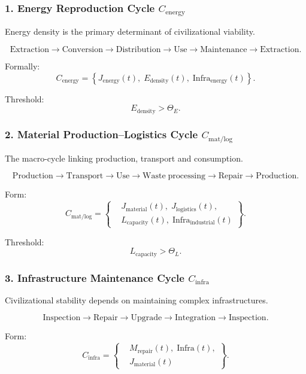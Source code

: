 \subsubsection{1. Energy Reproduction Cycle $C_{\mathrm{energy}}$}

Energy density is the primary determinant of civilizational viability.

\[
  \mathrm{Extraction}
  \to
  \mathrm{Conversion}
  \to
  \mathrm{Distribution}
  \to
  \mathrm{Use}
  \to
  \mathrm{Maintenance}
  \to
  \mathrm{Extraction}.
\]

Formally:
\[
  C_{\mathrm{energy}} =
  \left\{
    J_{\mathrm{energy}}(t),\;
    E_{\mathrm{density}}(t),\;
    \mathrm{Infra}_{\mathrm{energy}}(t)
  \right\}.
\]

Threshold:
\[
  E_{\mathrm{density}} > \Theta_E.
\]

\subsubsection{2. Material Production–Logistics Cycle $C_{\mathrm{mat/log}}$}

The macro-cycle linking production, transport and consumption.

\[
  \mathrm{Production}
  \to
  \mathrm{Transport}
  \to
  \mathrm{Use}
  \to
  \mathrm{Waste\;processing}
  \to
  \mathrm{Repair}
  \to
  \mathrm{Production}.
\]

Form:
\[
 C_{\mathrm{mat/log}} =
 \left\{
 \begin{aligned}
   &J_{\mathrm{material}}(t),\;
    J_{\mathrm{logistics}}(t),\\
   &L_{\mathrm{capacity}}(t),\;
    \mathrm{Infra}_{\mathrm{industrial}}(t)
 \end{aligned}
 \right\}.
\]

Threshold:
\[
  L_{\mathrm{capacity}} > \Theta_L.
\]

\subsubsection{3. Infrastructure Maintenance Cycle $C_{\mathrm{infra}}$}

Civilizational stability depends on maintaining complex infrastructures.

\[
  \mathrm{Inspection}
  \to
  \mathrm{Repair}
  \to
  \mathrm{Upgrade}
  \to
  \mathrm{Integration}
  \to
  \mathrm{Inspection}.
\]

Form:
\[
  C_{\mathrm{infra}} =
  \left\{
  \begin{aligned}
     &M_{\mathrm{repair}}(t),\;
      \mathrm{Infra}(t),\\
     &J_{\mathrm{material}}(t)
  \end{aligned}
  \right\}.
\]

